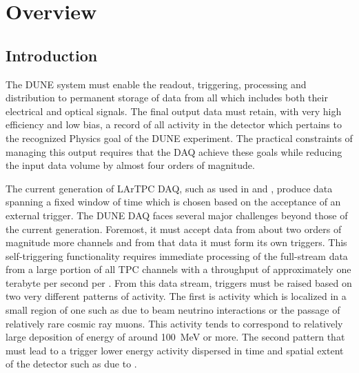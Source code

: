 \section{Overview}
\label{sec:fd-daq-ov}


\subsection{Introduction}
\label{sec:fd-daq-intro}

The DUNE   system must enable the readout,
triggering, processing and distribution to permanent storage of data
from all  which includes both their electrical
 and optical  signals.  
The final output data must retain, with very high efficiency and low
bias, a record of all activity in the detector which pertains to the
recognized Physics goal of the DUNE experiment. 
The practical constraints of managing this output requires that the
DAQ achieve these goals while reducing the input data volume by almost four
orders of magnitude.

The current generation of LArTPC DAQ, such as used in
 and \microboone, produce data spanning a fixed window of
time which is chosen based on the acceptance of an external trigger. 
The DUNE DAQ faces several major challenges beyond those of the
current generation. 
Foremost, it must accept data from about two orders of magnitude more
channels and from that data it must form its own triggers.
This self-triggering functionality requires immediate processing of
the full-stream data from a large portion of all TPC channels with a
throughput of approximately one terabyte per second per
. 
From this data stream, triggers must be raised based on two very
different patterns of activity. 
The first is activity which is localized in a small region of one
 such as due to beam neutrino interactions or the
passage of relatively rare cosmic ray muons. 
This activity tends to correspond to relatively large deposition of
energy of around \SI{100}{\MeV} or more. 
The second pattern that must lead to a trigger lower energy activity
dispersed in time and spatial extent of the detector such as due to
.

